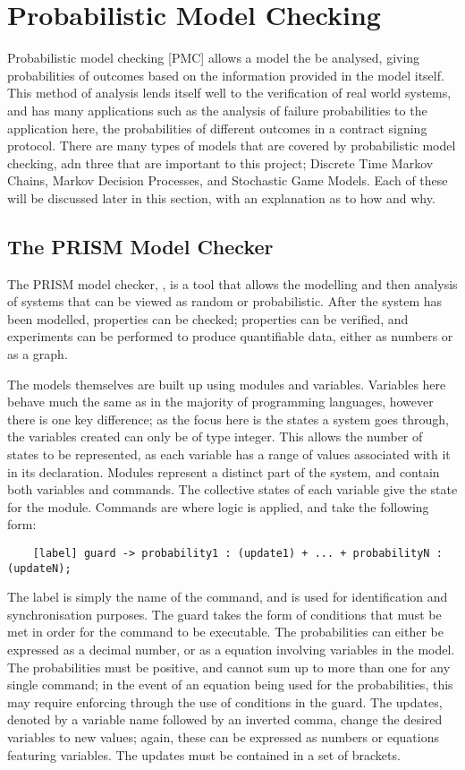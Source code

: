 \documentclass{l4proj}
\begin{document}
\section{Probabilistic Model Checking}


Probabilistic model checking [PMC] allows a model the be analysed, giving probabilities of outcomes based on the information provided in the model itself. This method of analysis lends itself well to the verification of real world systems, and has many applications such as the analysis of failure probabilities to the application here, the probabilities of different outcomes in a contract signing protocol. There are many types of models that are covered by probabilistic model checking, adn three that are important to this project; Discrete Time Markov Chains, Markov Decision Processes, and Stochastic Game Models. Each of these will be discussed later in this section, with an explanation as to how and why.

\subsection{The PRISM Model Checker}

The PRISM model checker, \cite{Pri}, is a tool that allows the modelling and then analysis of systems that can be viewed as random or probabilistic. After the system has been modelled, properties can be checked; properties can be verified, and experiments can be performed to produce quantifiable data, either as numbers or as a graph. 

The models themselves are built up using modules and variables. Variables here behave much the same as in the majority of programming languages, however there is one key difference; as the focus here is the states a system goes through, the variables created can only be of type integer. This allows the number of states to be represented, as each variable has a range of values associated with it in its declaration. Modules represent a distinct part of the system, and contain both variables and commands. The collective states of each variable give the state for the module. Commands are where logic is applied, and take the following form: 

\begin{lstlisting}
    [label] guard -> probability1 : (update1) + ... + probabilityN : (updateN);
\end{lstlisting}

The label is simply the name of the command, and is used for identification and synchronisation purposes. The guard takes the form of conditions that must be met in order for the command to be executable. The probabilities can either be expressed as a decimal number, or as a equation involving variables in the model. The probabilities must be positive, and cannot sum up to more than one for any single command; in the event of an equation being used for the probabilities, this may require enforcing through the use of conditions in the guard. The updates, denoted by a variable name followed by an inverted comma, change the desired variables to new values; again, these can be expressed as numbers or equations featuring variables. The updates must be contained in a set of brackets.
\end{document}
